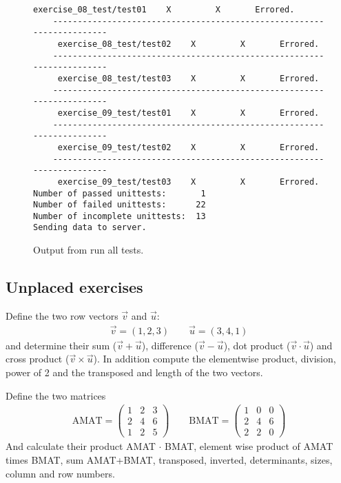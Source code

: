 \begin{figure}
\begin{lstlisting}[basicstyle=\scriptsize]
     exercise_08_test/test01    X         X       Errored.
    ----------------------------------------------------------------------
     exercise_08_test/test02    X         X       Errored.
    ----------------------------------------------------------------------
     exercise_08_test/test03    X         X       Errored.
    ----------------------------------------------------------------------
     exercise_09_test/test01    X         X       Errored.
    ----------------------------------------------------------------------
     exercise_09_test/test02    X         X       Errored.
    ----------------------------------------------------------------------
     exercise_09_test/test03    X         X       Errored.
Number of passed unittests:       1
Number of failed unittests:      22
Number of incomplete unittests:  13
Sending data to server.
\end{lstlisting}
\caption{Output from run all tests.}
\label{figRunAllTestsOutput}
\end{figure}



\newpage
\subsection{Unplaced exercises}

\begin{ex}
Define the two row vectors $\vec{v}$ and $\vec{u}$:
\begin{align*}
\vec{v} = (1, 2, 3) \qquad \vec{u} = (3, 4, 1)
\end{align*}
and determine their 
sum ($\vec{v} + \vec{u}$),
difference ($\vec{v} - \vec{u}$),
dot product ($\vec{v} \cdot \vec{u}$) and
cross product ($\vec{v} \times \vec{u}$).
In addition compute the elementwise product, division, power of 2 and 
the transposed and length of the two vectors.
\end{ex}


\begin{ex}
Define the two matrices
\begin{align*}
\textrm{AMAT} = \begin{pmatrix}
1 &2 &3	\\
2 &4 &6	\\
1 &2 &5
\end{pmatrix}
\qquad
\textrm{BMAT} =
\begin{pmatrix}
1 &0 &0	\\
2 &4 &6	\\
2 &2 &0
\end{pmatrix}
\end{align*}
And calculate their product AMAT $\cdot$ BMAT, element wise product of AMAT times BMAT, sum
AMAT+BMAT, transposed, inverted, determinants, sizes, column and row numbers.
\end{ex}


